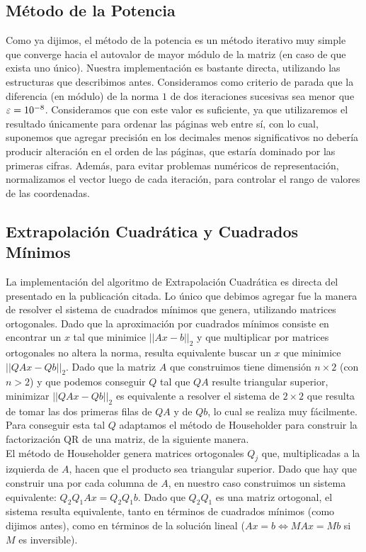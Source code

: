 \subsection{Método de la Potencia}
Como ya dijimos, el método de la potencia es un método iterativo muy simple que converge hacia el autovalor de mayor módulo de la matriz (en caso de que exista uno único). Nuestra implementación es bastante directa, utilizando las estructuras que describimos antes. Consideramos como criterio de parada que la diferencia (en módulo) de la norma $1$ de dos iteraciones sucesivas sea menor que $\varepsilon = 10^{-8}$. Consideramos que con este valor es suficiente, ya que utilizaremos el resultado únicamente para ordenar las páginas web entre sí, con lo cual, suponemos que agregar precisión en los decimales menos significativos no debería producir alteración en el orden de las páginas, que estaría dominado por las primeras cifras. Además, para evitar problemas numéricos de representación, normalizamos el vector luego de cada iteración, para controlar el rango de valores de las coordenadas.

\subsection{Extrapolación Cuadrática y Cuadrados Mínimos}
La implementación del algoritmo de Extrapolación Cuadrática es directa del presentado en la publicación citada. Lo único que debimos agregar fue la manera de resolver el sistema de cuadrados mínimos que genera, utilizando matrices ortogonales. Dado que la aproximación por cuadrados mínimos consiste en encontrar un $x$ tal que minimice $||Ax-b||_2$ y que multiplicar por matrices ortogonales no altera la norma, resulta equivalente buscar un $x$ que minimice $||QAx -Qb||_2$. Dado que la matriz $A$ que construimos tiene dimensión $n\times 2$ (con $n > 2$) y que podemos conseguir $Q$ tal que $QA$ resulte triangular superior, minimizar $||QAx -Qb||_2$ es equivalente a resolver el sistema de $2\times 2$ que resulta de tomar las dos primeras filas de $QA$ y de $Qb$, lo cual se realiza muy fácilmente. Para conseguir esta tal $Q$ adaptamos el método de Householder para construir la factorización QR de una matriz, de la siguiente manera.\\ 

El método de Householder genera matrices ortogonales $Q_j$ que, multiplicadas a la izquierda de $A$, hacen que el producto sea triangular superior. Dado que hay que construir una por cada columna de $A$, en nuestro caso construimos un sistema equivalente: $Q_2 Q_1 A x = Q_2 Q_1 b$. Dado que $Q_2 Q_1$ es una matriz ortogonal, el sistema resulta equivalente, tanto en términos de cuadrados mínimos (como dijimos antes), como en términos de la solución lineal ($Ax = b \Leftrightarrow MAx = Mb$ si $M$ es inversible). \\

